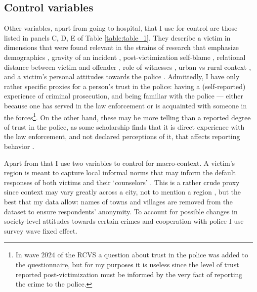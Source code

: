 \documentclass[]{interact}
\theoremstyle{plain}%
\theoremstyle{definition}
\theoremstyle{remark}
\newcommand\citep{\parencite}
\begin{document}
	
	

	
	\subsection*{Control variables} 
	
	Other variables, apart from going to hospital, that I use for control are those listed in panels C, D, E of Table \ref{table:table_1}. They describe a victim in dimensions that were found relevant in the strains of research that emphasize demographics \citep{zaykowski2019examining, hart2003reporting, baumer2010reporting, black1973mobilization}, gravity of an incident \citep{skogan1976citizen, skogan1984reporting, gottfredson1979study, tarling2010reporting}, post-victimization self-blame \citep{felson1999victim, kaukinen2002help, knoth2019reporting}, relational distance between victim and offender \citep{felson2016victims, ruback1993comment, kaukinen2004help, brennan2016violence, gartner1995effect}, role of witnesses \citep{felson1999victim},  urban vs rural context \citep{rennison2013context,black1976behavior,laub1981ecological}, and a victim's personal attitudes towards the police \citep{goudriaan2004reporting,boateng2018crime,ann2010neighborhood,warner2007directly,xie2006prior}. Admittedly, I have only rather specific proxies for a person's trust in the police: having a (self-reported) experience of criminal prosecution, and being familiar with the police --- either because one has served in the law enforcement or is acquainted with someone in the forces\footnote{In wave 2024 of the RCVS a question about trust in the police was added to the questionnaire, but for my purposes it is useless since the level of trust reported post-victimization must be informed by the very fact of reporting the crime to the police.}. On the other hand, these may be more telling than a reported degree of trust in the police, as some scholarship finds that it is direct experience with the law enforcement, and not declared perceptions of it, that affects reporting behavior \citep{davis2003willingness}.
	
	Apart from that I use two variables to control for macro-context. A victim's region is meant to capture local informal norms that may inform the default responses of both victims and their `counselors' \citep{goudriaan2004reporting}. This is a rather crude proxy since context may vary greatly across a city, not to mention a region \citep{goudriaan2006neighbourhood, baumer2002neighborhood}, but the best that my data allow: names of towns and villages are removed from the dataset to ensure respondents' anonymity. To account for possible changes in society-level attitudes towards certain crimes and cooperation with police \citep{tarling2010reporting} I use survey wave fixed effect.
	
\end{document}
